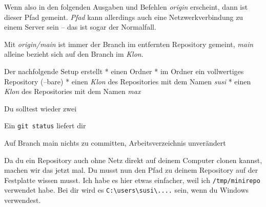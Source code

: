 \documentclass[
  letterpaper,
  DIV=11]{scrreprt}
\newenvironment{Shaded}{\begin{snugshade}}{\end{snugshade}}
\newcommand{\AttributeTok}[1]{\textcolor[rgb]{0.40,0.45,0.13}{#1}}
\newcommand{\BuiltInTok}[1]{\textcolor[rgb]{0.00,0.23,0.31}{#1}}
\newcommand{\CommentTok}[1]{\textcolor[rgb]{0.37,0.37,0.37}{#1}}
\newcommand{\ExtensionTok}[1]{\textcolor[rgb]{0.00,0.23,0.31}{#1}}
\newcommand{\FunctionTok}[1]{\textcolor[rgb]{0.28,0.35,0.67}{#1}}
\newcommand{\NormalTok}[1]{\textcolor[rgb]{0.00,0.23,0.31}{#1}}
\newcommand{\OperatorTok}[1]{\textcolor[rgb]{0.37,0.37,0.37}{#1}}
\newcommand{\StringTok}[1]{\textcolor[rgb]{0.13,0.47,0.30}{#1}}
\newcommand{\VariableTok}[1]{\textcolor[rgb]{0.07,0.07,0.07}{#1}}
\newcommand{\branch}[1]{\textit{#1}\xspace}
\begin{document}
Wenn also in den folgenden Ausgaben und Befehlen \emph{origin}
erscheint, dann ist dieser Pfad gemeint. \emph{Pfad} kann allerdings
auch eine Netzwerkverbindung zu einem Server sein -- das ist sogar der
Normalfall.

Mit \branch{origin/main} ist immer der Branch im entfernten Repository
gemeint, \branch{main} alleine bezieht sich auf den Branch im
\emph{Klon}.

Der nachfolgende Setup erstellt * einen Ordner * im Ordner ein
vollwertiges Repository (--bare) * einen \emph{Klon} des Repositories
mit dem Namen \emph{susi} * einen \emph{Klon} des Repositories mit dem
Namen \emph{max}

Du solltest wieder zwei

\begin{Shaded}
\end{Shaded}

Ein \texttt{git\ status} liefert dir

\begin{Shaded}
\begin{Highlighting}[]
\ExtensionTok{Auf}\NormalTok{ Branch main}
\ExtensionTok{nichts}\NormalTok{ zu committen, Arbeitsverzeichnis unverändert}
\end{Highlighting}
\end{Shaded}

Da du ein Repository auch ohne Netz direkt auf deinem Computer clonen
kannst, machen wir das jetzt mal. Du musst nun den Pfad zu deinem
Repository auf der Festplatte wissen musst. Ich habe es hier etwas
einfacher, weil ich \texttt{/tmp/minirepo} verwendet habe. Bei dir wird
es
\texttt{C:\textbackslash{}users\textbackslash{}susi\textbackslash{}....}
sein, wenn du Windows verwendest.
\end{document}

